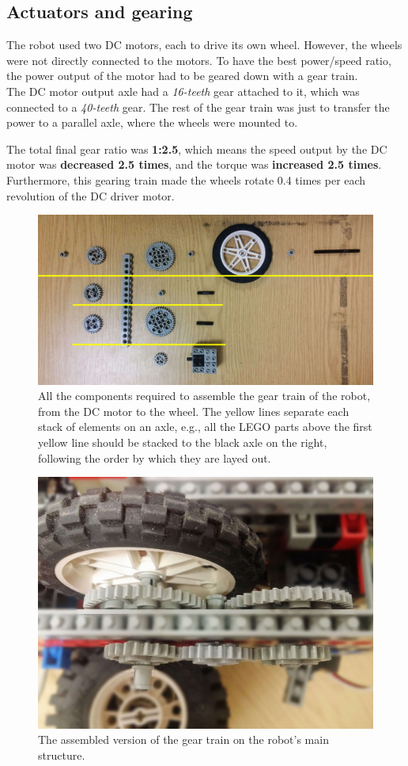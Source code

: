 
\subsection{Actuators and gearing}

The robot used two DC motors, each to drive its own wheel. However, the wheels were not directly connected to the motors. To have the best power/speed ratio, the power output of the motor had to be geared down with a gear train.\\
The DC motor output axle had a \textit{16-teeth} gear attached to it, which was connected to a \textit{40-teeth} gear. The rest of the gear train was just to transfer the power to a parallel axle, where the wheels were mounted to.

The total final gear ratio was \textbf{1:2.5}, which means the speed output by the DC motor was \textbf{decreased 2.5 times}, and the torque was \textbf{increased 2.5 times}. Furthermore, this gearing train made the wheels rotate 0.4 times per each revolution of the DC driver motor.

\bigskip

\begin{figure}[ht]
    \centering
    \includegraphics[width=0.7\linewidth]{res/robot-pics/gear-train-unmounted.jpg}
    \caption{All the components required to assemble the gear train of the robot, from the DC motor to the wheel. The yellow lines separate each stack of elements on an axle, e.g., all the LEGO parts above the first yellow line should be stacked to the black axle on the right, following the order by which they are layed out.}
    \label{fig:gear-train-unmounted}
\end{figure}

\begin{figure}[ht]
    \centering
    \includegraphics[width=0.7\linewidth]{res/robot-pics/gear-train-mounted.jpg}
    \caption{The assembled version of the gear train on the robot's main structure.}
    \label{fig:gear-train-mounted}
\end{figure}

